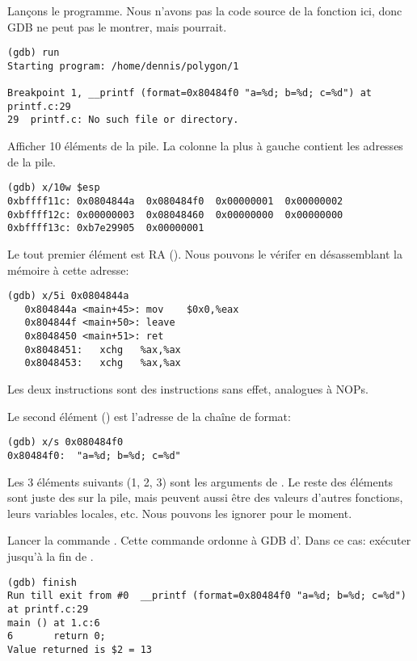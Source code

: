 Lançons le programme.
Nous n'avons pas la code source de la fonction \printf ici, donc \ac{GDB} ne peut
pas le montrer, mais pourrait.

\begin{lstlisting}
(gdb) run
Starting program: /home/dennis/polygon/1 

Breakpoint 1, __printf (format=0x80484f0 "a=%d; b=%d; c=%d") at printf.c:29
29	printf.c: No such file or directory.
\end{lstlisting}

Afficher 10 éléments de la pile. La colonne la plus à gauche contient les adresses
de la pile.

\begin{lstlisting}
(gdb) x/10w $esp
0xbffff11c:	0x0804844a	0x080484f0	0x00000001	0x00000002
0xbffff12c:	0x00000003	0x08048460	0x00000000	0x00000000
0xbffff13c:	0xb7e29905	0x00000001
\end{lstlisting}

Le tout premier élément est \ac{RA} ().
Nous pouvons le vérifer en désassemblant la mémoire à cette adresse:

\begin{lstlisting}[label=NOP_as_XCHG_example,style=customasmx86]
(gdb) x/5i 0x0804844a
   0x804844a <main+45>:	mov    $0x0,%eax
   0x804844f <main+50>:	leave  
   0x8048450 <main+51>:	ret    
   0x8048451:	xchg   %ax,%ax
   0x8048453:	xchg   %ax,%ax
\end{lstlisting}

Les deux instructions  sont des instructions sans effet, analogues à \ac{NOP}s.

Le second élément () est l'adresse de la chaîne de format:

\begin{lstlisting}
(gdb) x/s 0x080484f0
0x80484f0:	"a=%d; b=%d; c=%d"
\end{lstlisting}

Les 3 éléments suivants (1, 2, 3) sont les arguments de \printf.
Le reste des éléments sont juste des  sur la pile, mais peuvent aussi
être des valeurs d'autres fonctions, leurs variables locales, etc.
Nous pouvons les ignorer pour le moment.

Lancer la commande .
Cette commande ordonne à GDB d'.
Dans ce cas: exécuter jusqu'à la fin de \printf.

\begin{lstlisting}
(gdb) finish
Run till exit from #0  __printf (format=0x80484f0 "a=%d; b=%d; c=%d") at printf.c:29
main () at 1.c:6
6		return 0;
Value returned is $2 = 13
\end{lstlisting}

